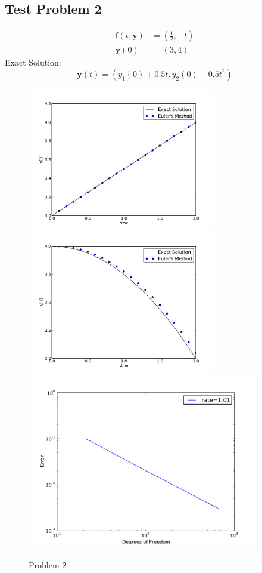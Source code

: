\documentclass[10pt,letterpaper]{article}
\def\y{\mathbf{y}}
\def\f{\mathbf{f}}
\begin{document}
\subsection*{Test Problem 2}
\begin{align*}
\f(t,\y) &= (\frac{1}{2},-t)\\
\y(0) &= (3, 4)
\end{align*}
Exact Solution:
\[
\y(t)=(y_1(0)+0.5t, y_2(0)-0.5t^2)
\]
\begin{figure}[h!]
\centering
\includegraphics[width=3.25in,keepaspectratio=true]{./p2_1.pdf}
\includegraphics[width=3.25in,keepaspectratio=true]{./p2_2.pdf}
\includegraphics[width=4in,keepaspectratio=true]{./p2_3.pdf}
\caption{Problem 2}
\end{figure}
\end{document}

